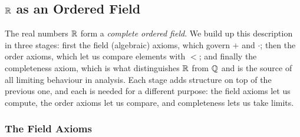 \subsection{\texorpdfstring{$\mathbb{R}$}{R} as an Ordered Field}
The real numbers $\mathbb{R}$ form a \emph{complete ordered field}. We build up this
description in three stages: first the field (algebraic) axioms, which govern
$+$ and $\cdot$; then the order axioms, which let us compare elements with
$<$; and finally the completeness axiom, which is what distinguishes $\mathbb{R}$ from
$\mathbb{Q}$ and is the source of all limiting behaviour in analysis. Each stage adds
structure on top of the previous one, and each is needed for a different
purpose: the field axioms let us compute, the order axioms let us compare, and
completeness lets us take limits.

\subsubsection{The Field Axioms}

